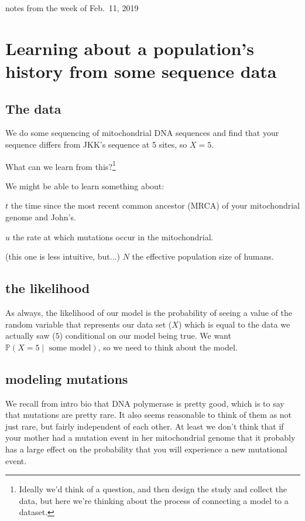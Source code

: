\documentclass[11pt]{article}
\renewcommand{\Pr}{\mathbb{P}}
\begin{document}
notes from the week of Feb.~11, 2019 \\
\tableofcontents

\section{Learning about a population's history from some sequence data}

\subsection{The data}
We do some sequencing of mitochondrial DNA sequences and find that your sequence
differs from JKK's sequence at 5 sites, so $X=5$.

What can we learn from this?\footnote{Ideally we'd think of a question, and then
design the study and collect the data, but here we're thinking about the process
of connecting a model to a dataset.}

We might be able to learn something about:
\begin{compactitem}
    \item $t$ the time since the most recent common ancestor (MRCA)
of your mitochondrial genome and John's.
    \item  $u$ the rate at which mutations occur in the mitochondrial.
    \item (this one is less intuitive, but$\ldots$) $N$ the effective population
    size of humans.
\end{compactitem}

\subsection{the likelihood}
As always, the likelihood of our model is the probability of seeing a value of the
    random variable that represents our data set ($X$) which is equal to
    the data we actually saw ($5$) conditional on our model being true.
We want $\Pr(X=5\mid\mbox{ some model})$, so we need to think about the model.

\subsection{modeling mutations}
We recall from intro bio that DNA polymerase is pretty good, which is to say 
that mutations are pretty rare.
It also seems reasonable to think of them as not just rare, but fairly independent of 
each other.
At least we don't think that if your mother had a mutation event in her mitochondrial 
   genome that it probably has a large effect on the probability that you will experience a new mutational event.
\end{document}
